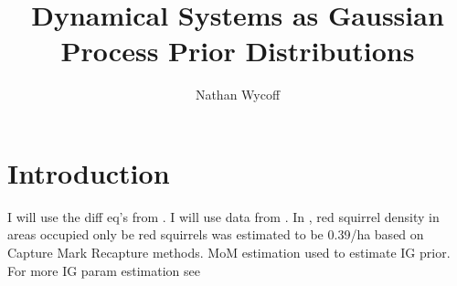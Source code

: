 \documentclass{article}
\title{Dynamical Systems as Gaussian Process Prior Distributions}
\author{Nathan Wycoff}
\begin{document}
	
	\maketitle
	
	\section{Introduction}
	
	I will use the diff eq's from \cite{okubo1989spatial}. I will use data from \cite{reynolds1985details}. In \cite{parker2008gray}, red squirrel density in areas occupied only be red squirrels was estimated to be 0.39/ha based on Capture Mark Recapture methods. MoM estimation used to estimate IG prior. For more IG param estimation see \cite{llera2016estimating}
	
	
	{}
	
	
\end{document}
